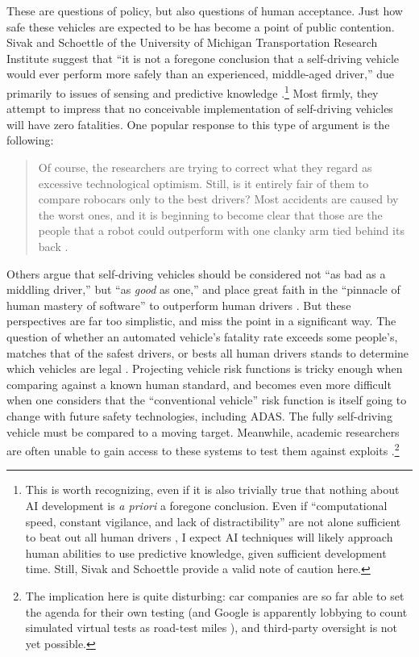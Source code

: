 These are questions of
  policy, but also questions of human acceptance. Just how safe these
  vehicles are expected to be has become a point of 
public contention. Sivak and Schoettle of the
University of Michigan Transportation Research Institute suggest that
``it is not a foregone conclusion that a 
self-driving vehicle would ever perform more safely than an
experienced, middle-aged driver,'' due primarily to issues of sensing and
predictive knowledge \cite[p. 7]{SivakSchoettle}.\footnote{This is worth
recognizing, even if it is also trivially true that nothing about AI
development is \emph{a priori} a foregone conclusion. Even if
``computational speed, constant vigilance, and lack of 
distractibility'' are not alone sufficient to beat out all human
drivers \cite[p. 4]{SivakSchoettle}, I expect AI techniques will
likely approach human 
abilities to use predictive 
knowledge, given sufficient development time. Still, Sivak and
Schoettle provide a valid note of caution here.} Most firmly, they
attempt to impress that no conceivable implementation of self-driving
vehicles will have zero fatalities. One popular response to this type of
argument is the following: 
\begin{quote}Of course, the researchers are trying to correct what they regard as
excessive technological optimism. Still, is it entirely fair of them
to compare robocars only to the best drivers? Most accidents are
caused by the worst ones, and it is beginning to become clear that
those are the people that a robot could outperform with one clanky
arm tied behind its back \cite{rossSafety}.\end{quote} 
Others argue that self-driving vehicles should be considered not ``as
bad as a middling 
driver,'' but ``as \emph{good} as one,'' and place great faith in the
``pinnacle of human mastery of software'' to outperform human drivers \cite{templetonB}.
But these perspectives are far too simplistic, and miss the point in a
significant way. The question of whether an
automated vehicle's fatality rate exceeds some people's, matches that
of the
safest drivers, or bests all human drivers stands to determine which
vehicles are legal \cite[p. 6]{SivakSchoettle}. Projecting vehicle
risk functions is tricky enough when comparing against a known human
standard, and becomes even more difficult when one considers that the
``conventional vehicle'' risk function is itself going to change with
future safety technologies, including ADAS. The fully self-driving
vehicle must be compared to a moving 
target. Meanwhile, academic researchers are often unable to gain access to
these systems to test them against exploits
\cite{madrigalHack}.\footnote{The
implication here is quite disturbing: car companies are so far able to
set the agenda for their own testing (and Google is apparently
lobbying to count simulated virtual tests as road-test miles
\cite{harrisVirtual}),
and third-party oversight is not yet possible.}

